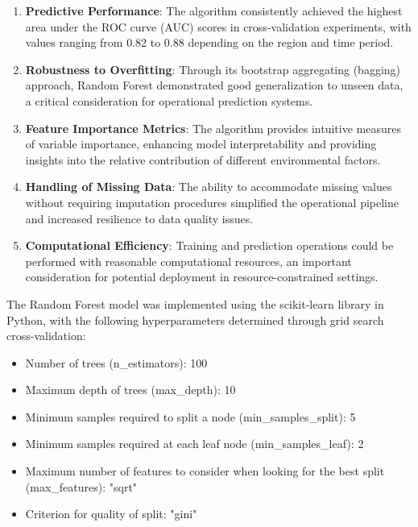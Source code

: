 \documentclass[12pt,a4paper]{report}
\begin{document}
\begin{enumerate}
    \item \textbf{Predictive Performance}: The algorithm consistently achieved the highest area under the ROC curve (AUC) scores in cross-validation experiments, with values ranging from 0.82 to 0.88 depending on the region and time period.
    
    \item \textbf{Robustness to Overfitting}: Through its bootstrap aggregating (bagging) approach, Random Forest demonstrated good generalization to unseen data, a critical consideration for operational prediction systems.
    
    \item \textbf{Feature Importance Metrics}: The algorithm provides intuitive measures of variable importance, enhancing model interpretability and providing insights into the relative contribution of different environmental factors.
    
    \item \textbf{Handling of Missing Data}: The ability to accommodate missing values without requiring imputation procedures simplified the operational pipeline and increased resilience to data quality issues.
    
    \item \textbf{Computational Efficiency}: Training and prediction operations could be performed with reasonable computational resources, an important consideration for potential deployment in resource-constrained settings.
\end{enumerate}

The Random Forest model was implemented using the scikit-learn library in Python, with the following hyperparameters determined through grid search cross-validation:

\begin{itemize}
    \item Number of trees (n\_estimators): 100
    \item Maximum depth of trees (max\_depth): 10
    \item Minimum samples required to split a node (min\_samples\_split): 5
    \item Minimum samples required at each leaf node (min\_samples\_leaf): 2
    \item Maximum number of features to consider when looking for the best split (max\_features): "sqrt"
    \item Criterion for quality of split: "gini"
\end{itemize}
\end{document}
